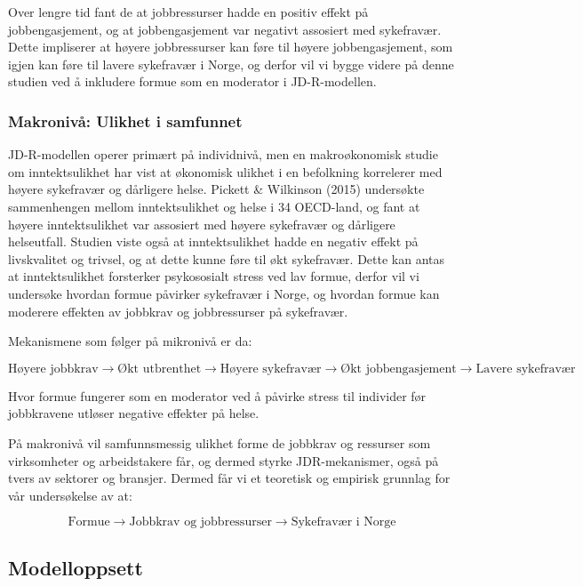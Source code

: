 \documentclass[
  12pt,
  a4paper,
  DIV=11,
  numbers=noendperiod]{scrartcl}
\begin{document}
Over lengre tid fant de at jobbressurser hadde en positiv effekt på
jobbengasjement, og at jobbengasjement var negativt assosiert med
sykefravær. Dette impliserer at høyere jobbressurser kan føre til høyere
jobbengasjement, som igjen kan føre til lavere sykefravær i Norge, og
derfor vil vi bygge videre på denne studien ved å inkludere formue som
en moderator i JD-R-modellen.

\subsubsection{Makronivå: Ulikhet i
samfunnet}\label{makronivuxe5-ulikhet-i-samfunnet}

JD-R-modellen operer primært på individnivå, men en makroøkonomisk
studie om inntektsulikhet har vist at økonomisk ulikhet i en befolkning
korrelerer med høyere sykefravær og dårligere helse. Pickett \&
Wilkinson (2015) undersøkte sammenhengen mellom inntektsulikhet og helse
i 34 OECD-land, og fant at høyere inntektsulikhet var assosiert med
høyere sykefravær og dårligere helseutfall. Studien viste også at
inntektsulikhet hadde en negativ effekt på livskvalitet og trivsel, og
at dette kunne føre til økt sykefravær. Dette kan antas at
inntektsulikhet forsterker psykososialt stress ved lav formue, derfor
vil vi undersøke hvordan formue påvirker sykefravær i Norge, og hvordan
formue kan moderere effekten av jobbkrav og jobbressurser på sykefravær.

Mekanismene som følger på mikronivå er da:

\[
\text{Høyere jobbkrav} \rightarrow \text{Økt utbrenthet} \rightarrow \text{Høyere sykefravær} \rightarrow \text{Økt jobbengasjement} \rightarrow \text{Lavere sykefravær}
\]

Hvor formue fungerer som en moderator ved å påvirke stress til individer
før jobbkravene utløser negative effekter på helse.

På makronivå vil samfunnsmessig ulikhet forme de jobbkrav og ressurser
som virksomheter og arbeidstakere får, og dermed styrke JDR-mekanismer,
også på tvers av sektorer og bransjer. Dermed får vi et teoretisk og
empirisk grunnlag for vår undersøkelse av at:

\[
\text{Formue} \rightarrow \text{Jobbkrav og jobbressurser} \rightarrow \text{Sykefravær i Norge}
\]

\subsection{Modelloppsett}\label{modelloppsett}
\end{document}
